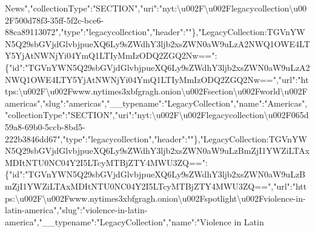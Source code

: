 News","collectionType":"SECTION","uri":"nyt:\textbackslash{}u002F\textbackslash{}u002Flegacycollection\textbackslash{}u002F500d78f3-35ff-5f2c-bce6-88ca89113072","type":"legacycollection","header":""\},"LegacyCollection:TGVnYWN5Q29sbGVjdGlvbjpueXQ6Ly9sZWdhY3ljb2xsZWN0aW9uLzA2NWQ1OWE4LTY5YjAtNWNjYi04YmQ1LTIyMmIzODQ2ZGQ2Nw==":\{"id":"TGVnYWN5Q29sbGVjdGlvbjpueXQ6Ly9sZWdhY3ljb2xsZWN0aW9uLzA2NWQ1OWE4LTY5YjAtNWNjYi04YmQ1LTIyMmIzODQ2ZGQ2Nw==","url":"https:\textbackslash{}u002F\textbackslash{}u002Fwww.nytimes3xbfgragh.onion\textbackslash{}u002Fsection\textbackslash{}u002Fworld\textbackslash{}u002Famericas","slug":"americas","\_\_typename":"LegacyCollection","name":"Americas","collectionType":"SECTION","uri":"nyt:\textbackslash{}u002F\textbackslash{}u002Flegacycollection\textbackslash{}u002F065d59a8-69b0-5ccb-8bd5-222b3846dd67","type":"legacycollection","header":""\},"LegacyCollection:TGVnYWN5Q29sbGVjdGlvbjpueXQ6Ly9sZWdhY3ljb2xsZWN0aW9uLzBmZjI1YWZiLTAxMDItNTU0NC04Y2I5LTcyMTBjZTY4MWU3ZQ==":\{"id":"TGVnYWN5Q29sbGVjdGlvbjpueXQ6Ly9sZWdhY3ljb2xsZWN0aW9uLzBmZjI1YWZiLTAxMDItNTU0NC04Y2I5LTcyMTBjZTY4MWU3ZQ==","url":"https:\textbackslash{}u002F\textbackslash{}u002Fwww.nytimes3xbfgragh.onion\textbackslash{}u002Fspotlight\textbackslash{}u002Fviolence-in-latin-america","slug":"violence-in-latin-america","\_\_typename":"LegacyCollection","name":"Violence
in Latin
